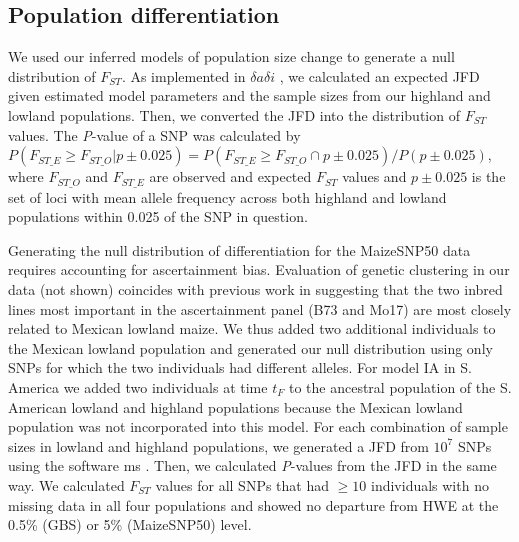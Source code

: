 \subsection*{Population differentiation}
We used our inferred models of population size change to generate a null distribution of $F_{ST}$.
As implemented in $\delta a \delta i$ \cite[]{Gutenkunst_2009_19851460}, we calculated an expected JFD given estimated model parameters and the sample sizes from our highland and lowland populations.
Then, we converted the JFD into the distribution of $F_{ST}$ values.
The \emph{P}-value of a SNP was calculated by $P(F_{ST\_E}\geq F_{ST\_O}|p\pm 0.025) = P(F_{ST\_E}\geq F_{ST\_O} \cap p\pm 0.025)/P(p\pm 0.025)$, 
where $F_{ST\_O}$ and $F_{ST\_E}$ are observed and expected $F_{ST}$ values and $p\pm 0.025$ is the set of loci with mean allele frequency across both highland and lowland populations within 0.025 of the SNP in question. 

Generating the null distribution of differentiation for the MaizeSNP50 data requires accounting for ascertainment bias. 
Evaluation of genetic clustering in our data (not shown) coincides with previous work \cite[]{Hufford_2012_22660546} in suggesting that the two inbred lines most important in the ascertainment panel (B73 and Mo17) are most closely related to Mexican lowland maize.  
We thus added two additional individuals to the Mexican lowland population and generated our null distribution using only SNPs for which the two individuals had different alleles.
For model IA in S. America we added two individuals at time $t_F$ to the ancestral population of the S. American lowland and highland populations because the Mexican lowland population was not incorporated into this model. 
For each combination of sample sizes in lowland and highland populations, we generated a JFD from $10^7$  SNPs using the software {\sf ms} \cite[]{Hudson_2002_11847089}.
Then, we calculated \emph{P}-values from the JFD in the same way.
We calculated $F_{ST}$ values for all SNPs that had $\geq10$ individuals with no missing data in all four populations and showed no departure from HWE at the 0.5\% (GBS) or 5\% (MaizeSNP50) level. 



